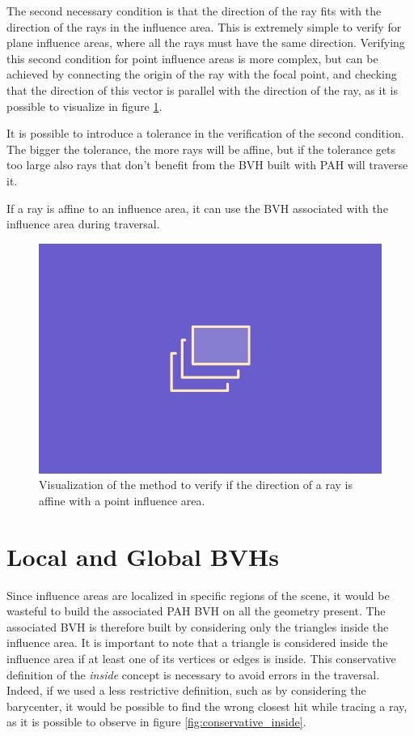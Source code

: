 \documentclass{PoliMi_MasterThesis}
\begin{document}
The second necessary condition is that the direction of the ray fits with the direction of the rays in the influence area. This is extremely simple to verify for plane influence areas, where all the rays must have the same direction. Verifying this second condition for point influence areas is more complex, but can be achieved by connecting the origin of the ray with the focal point, and checking that the direction of this vector is parallel with the direction of the ray, as it is possible to visualize in figure \ref{fig:affine_direction}.

It is possible to introduce a tolerance in the verification of the second condition. The bigger the tolerance, the more rays will be affine, but if the tolerance gets too large also rays that don't benefit from the BVH built with PAH will traverse it.

If a ray is affine to an influence area, it can use the BVH associated with the influence area during traversal.

\begin{figure}[]
    \centering
    \includegraphics[width=\textwidth*\real{0.6}]{Images/TODO.png}
    \caption{Visualization of the method to verify if the direction of a ray is affine with a point influence area.}
    \label{fig:affine_direction}
\end{figure}

\section{Local and Global BVHs} \label{sec:local_and_global_bvhs}

Since influence areas are localized in specific regions of the scene, it would be wasteful to build the associated PAH BVH on all the geometry present. The associated BVH is therefore built by considering only the triangles inside the influence area. It is important to note that a triangle is considered inside the influence area if at least one of its vertices or edges is inside. This conservative definition of the \textit{inside} concept is necessary to avoid errors in the traversal. Indeed, if we used a less restrictive definition, such as by considering the barycenter, it would be possible to find the wrong closest hit while tracing a ray, as it is possible to observe in figure \ref{fig:conservative_inside}.
\end{document}
